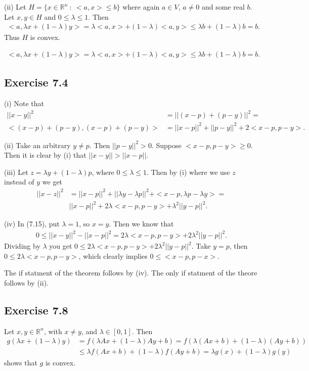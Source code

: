 \documentclass[11.5pt, letterpaper, bibtotoc,
    tablecaptionabove, figurecaptionabove]{article}
\begin{document}
(ii)
Let $H=\{x\in\mathbb R^n\ :\ <a,x>\leq b\}$ where again $a\in V$, $a\neq 0$ and some real $b$.
Let $x,y\in H$ and $0\leq\lambda\leq 1$.
Then 
\begin{align*}
    <a,\lambda x+(1-\lambda)y>=\lambda<a,x>+(1-\lambda)<a,y>\leq\lambda b + (1-\lambda)b=b.
\end{align*}
Thus $H$ is convex.

\begin{align*}
       <a,\lambda x+(1-\lambda)y>=\lambda<a,x>+(1-\lambda)<a,y>\leq\lambda b + (1-\lambda)b=b.
\end{align*}

\subsection*{Exercise 7.4}
(i)
Note that
\begin{align*}
    ||x-y||^2&=||(x-p)+(p-y)||^2=\\
    <(x-p)+(p-y),(x-p)+(p-y)>&=
    ||x-p||^2+||p-y||^2+2<x-p,p-y>.
\end{align*}

(ii)
Take an arbitrary $y\neq p$. Then $||p-y||^2> 0$.
Suppose $<x-p,p-y>\geq0$. Then it is clear by (i)
that $||x-y||>||x-p||$.

(iii)
Let $z=\lambda y+(1-\lambda)p$, where $0\leq\lambda\leq1$.
Then by (i) where we use $z$ instead of $y$ we get
\begin{align*}
    ||x-z||^2&=
    ||x-p||^2+||\lambda y-\lambda p||^2+
    <x-p,\lambda p-\lambda y>=\\
    &||x-p||^2+2\lambda<x-p,p-y>+\lambda^2||y-p||^2.
\end{align*}

(iv)
In (7.15), put $\lambda=1$, so $x=y$.
Then we know that
\begin{align*}
    0\leq||x-y||^2-||x-p||^2=2\lambda<x-p,p-y>+2\lambda^2||y-p||^2.
\end{align*}
Dividing by $\lambda$ you get $0\leq2\lambda<x-p,p-y>+2\lambda^2||y-p||^2$.
Take $y=p$, then $0\leq2\lambda<x-p,p-y>$, which clearly implies $0\leq<x-p,p-x>$.

The if statment of the theorem follows by (iv).
The only if statment of the theore follows by (ii).

\subsection*{Exercise 7.8}
Let $x, y\in\mathbb R^n$, with $x\neq y$, and $\lambda\in[0,1]$.
Then
\begin{align*}
    g(\lambda x+(1-\lambda)y)&=
    f(\lambda Ax + (1-\lambda)Ay + b)=
    f(\lambda(Ax+b) + (1-\lambda)(Ay+b))\\
    &\leq\lambda f(Ax+b) + (1-\lambda)f(Ay+b)=
    \lambda g(x) + (1-\lambda)g(y)
\end{align*}
shows that $g$ is convex.
\end{document}
